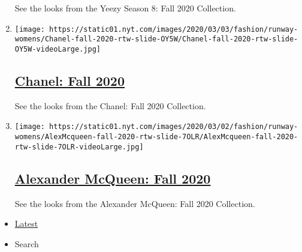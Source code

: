 \begin{enumerate}
  See the looks from the Yeezy Season 8: Fall 2020 Collection.
\item
  \texttt{[image: https://static01.nyt.com/images/2020/03/03/fashion/runway-womens/Chanel-fall-2020-rtw-slide-OY5W/Chanel-fall-2020-rtw-slide-OY5W-videoLarge.jpg]}

  \hypertarget{chanel-fall-2020}{%
  \subsection{\texorpdfstring{\href{/slideshow/2020/03/03/fashion/runway-womens/chanel-fall-2020.html}{Chanel:
  Fall 2020}}{Chanel: Fall 2020}}\label{chanel-fall-2020}}

  See the looks from the Chanel: Fall 2020 Collection.
\item
  \texttt{[image: https://static01.nyt.com/images/2020/03/02/fashion/runway-womens/AlexMcqueen-fall-2020-rtw-slide-7OLR/AlexMcqueen-fall-2020-rtw-slide-7OLR-videoLarge.jpg]}

  \hypertarget{alexander-mcqueen-fall-2020}{%
  \subsection{\texorpdfstring{\href{/slideshow/2020/03/02/fashion/runway-womens/alexander-mcqueen-fall-2020.html}{Alexander
  McQueen: Fall
  2020}}{Alexander McQueen: Fall 2020}}\label{alexander-mcqueen-fall-2020}}

  See the looks from the Alexander McQueen: Fall 2020 Collection.
\end{enumerate}

\begin{itemize}
\tightlist
\item
  \protect\hyperlink{stream-panel}{Latest}
\item
  Search
\end{itemize}

